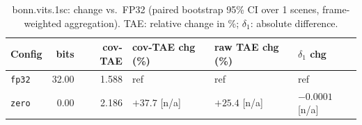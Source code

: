 \begin{table}[t]
\centering
\small
\caption{bonn.vits.1sc: change vs.\ FP32 (paired bootstrap 95\% CI over 1 scenes, frame-weighted aggregation). TAE: relative change in \%; $\delta_1$: absolute difference.}
\label{tab:boot_bonn_vits_1sc_fw}
\begin{tabular}{lrrlll}
\toprule
Config & bits & cov-TAE & cov-TAE chg (\%) & raw TAE chg (\%) & $\delta_1$ chg \\
\midrule
\texttt{fp32} & 32.00 & 1.588 & ref & ref & ref \\
\texttt{zero} & 0.00 & 2.186 & $+37.7$ [n/a] & $+25.4$ [n/a] & $-0.0001$ [n/a] \\
\bottomrule
\end{tabular}
\end{table}
